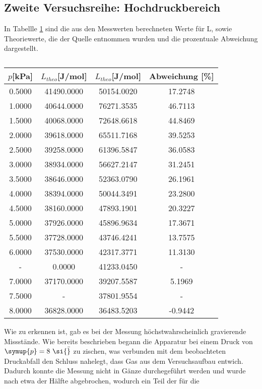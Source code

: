 \subsection{Zweite Versuchsreihe: Hochdruckbereich}
In Tabellle \ref{tab:hdr} sind die aus den Messwerten berechneten Werte für L, sowie Theoriewerte, die der
Quelle \cite{Dampfdrucktabelle} entnommen wurden und die prozentuale Abweichung dargestellt.
\begin{table}[H]
\centering
   \caption{}
   \label{tab:hdr}
   \begin{tabular}{c c c c}
   \toprule
     $p$[kPa] & $L_{theo}$[J/mol] & $L_{theo}$[J/mol] & Abweichung [\%] \\
    \midrule
      0.5000 & 41490.0000 & 50154.0020 &    17.2748 \\     1.0000 & 40644.0000 & 76271.3535 &    46.7113 \\     1.5000 & 40068.0000 & 72648.6618 &    44.8469 \\     2.0000 & 39618.0000 & 65511.7168 &    39.5253 \\     2.5000 & 39258.0000 & 61396.5847 &    36.0583 \\     3.0000 & 38934.0000 & 56627.2147 &    31.2451 \\     3.5000 & 38646.0000 & 52363.0790 &    26.1961 \\     4.0000 & 38394.0000 & 50044.3491 &    23.2800 \\     4.5000 & 38160.0000 & 47893.1901 &    20.3227 \\     5.0000 & 37926.0000 & 45896.9634 &    17.3671 \\     5.5000 & 37728.0000 & 43746.4241 &    13.7575 \\     6.0000 & 37530.0000 & 42317.3771 &    11.3130 \\     - &     0.0000 & 41233.0450 &   - \\     7.0000 & 37170.0000 & 39207.5587 &     5.1969 \\     7.5000 &     - & 37801.9554 &   - \\     8.0000 & 36828.0000 & 36483.5203 &    -0.9442 \\ 
    \bottomrule
    \end{tabular}
\end{table}
\noindent Wie zu erkennen ist, gab es bei der Messung höchstwahrscheinlich gravierende Missstände.
Wie bereits beschrieben begann die Apparatur bei einem Druck von $\symup{p} = 8 \ \si{\bar}$ zu zischen, was verbunden mit dem beobachteten Druckabfall den Schluss nahelegt, dass
Gas aus dem Versuchsaufbau entwich. Dadurch konnte die Messung nicht in Gänze durchegeführt werden und wurde nach etwa der Hälfte abgebrochen, wodurch ein Teil der für die 
